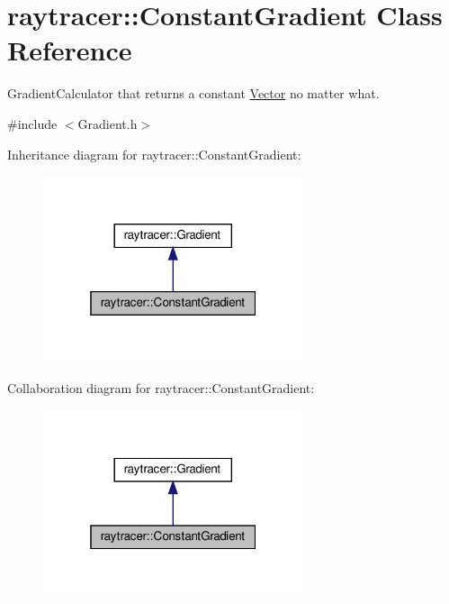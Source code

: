 \hypertarget{classraytracer_1_1ConstantGradient}{}\section{raytracer\+:\+:Constant\+Gradient Class Reference}
\label{classraytracer_1_1ConstantGradient}


Gradient\+Calculator that returns a constant \hyperlink{classraytracer_1_1Vector}{Vector} no matter what.  




{\ttfamily \#include $<$Gradient.\+h$>$}



Inheritance diagram for raytracer\+:\+:Constant\+Gradient\+:
\nopagebreak
\begin{figure}[H]
\begin{center}
\leavevmode
\includegraphics[width=217pt]{classraytracer_1_1ConstantGradient__inherit__graph}
\end{center}
\end{figure}


Collaboration diagram for raytracer\+:\+:Constant\+Gradient\+:
\nopagebreak
\begin{figure}[H]
\begin{center}
\leavevmode
\includegraphics[width=217pt]{classraytracer_1_1ConstantGradient__coll__graph}
\end{center}
\end{figure}
